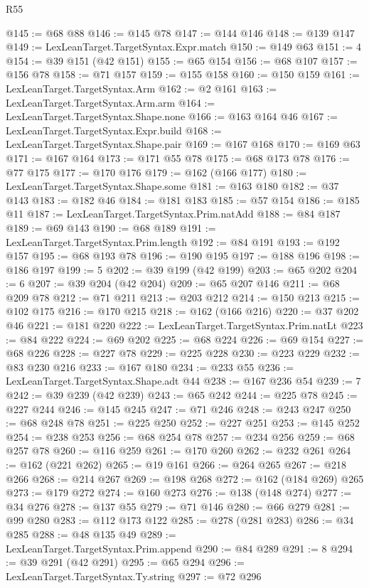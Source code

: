 \begin{lexlean}{R55}
\begin{coremodule}
{{{{{{{{{{{{{{{{{{{{{{{{{{{{{{{{{{{{{{{{{{{{{{{{{{{{{{{{{{{{@145 := @68 @88
@146 := @145 @78
@147 := @144 @146
@148 := @139 @147
@149 := LexLeanTarget.TargetSyntax.Expr.match
@150 := @149 @63
@151 := 4
@154 := @39 @151 (@42 @151)
@155 := @65 @154
@156 := @68 @107
@157 := @156 @78
@158 := @71 @157
@159 := @155 @158
@160 := @150 @159
@161 := LexLeanTarget.TargetSyntax.Arm
@162 := @2 @161
@163 := LexLeanTarget.TargetSyntax.Arm.arm
@164 := LexLeanTarget.TargetSyntax.Shape.none
@166 := @163 @164 @46
@167 := LexLeanTarget.TargetSyntax.Expr.build
@168 := LexLeanTarget.TargetSyntax.Shape.pair
@169 := @167 @168
@170 := @169 @63
@171 := @167 @164
@173 := @171 @55 @78
@175 := @68 @173 @78
@176 := @77 @175
@177 := @170 @176
@179 := @162 (@166 @177)
@180 := LexLeanTarget.TargetSyntax.Shape.some
@181 := @163 @180
@182 := @37 @143
@183 := @182 @46
@184 := @181 @183
@185 := @57 @154
@186 := @185 @11
@187 := LexLeanTarget.TargetSyntax.Prim.natAdd
@188 := @84 @187
@189 := @69 @143
@190 := @68 @189
@191 := LexLeanTarget.TargetSyntax.Prim.length
@192 := @84 @191
@193 := @192 @157
@195 := @68 @193 @78
@196 := @190 @195
@197 := @188 @196
@198 := @186 @197
@199 := 5
@202 := @39 @199 (@42 @199)
@203 := @65 @202
@204 := 6
@207 := @39 @204 (@42 @204)
@209 := @65 @207 @146
@211 := @68 @209 @78
@212 := @71 @211
@213 := @203 @212
@214 := @150 @213
@215 := @102 @175
@216 := @170 @215
@218 := @162 (@166 @216)
@220 := @37 @202 @46
@221 := @181 @220
@222 := LexLeanTarget.TargetSyntax.Prim.natLt
@223 := @84 @222
@224 := @69 @202
@225 := @68 @224
@226 := @69 @154
@227 := @68 @226
@228 := @227 @78
@229 := @225 @228
@230 := @223 @229
@232 := @83 @230 @216
@233 := @167 @180
@234 := @233 @55
@236 := LexLeanTarget.TargetSyntax.Shape.adt @44
@238 := @167 @236 @54
@239 := 7
@242 := @39 @239 (@42 @239)
@243 := @65 @242
@244 := @225 @78
@245 := @227 @244
@246 := @145 @245
@247 := @71 @246
@248 := @243 @247
@250 := @68 @248 @78
@251 := @225 @250
@252 := @227 @251
@253 := @145 @252
@254 := @238 @253
@256 := @68 @254 @78
@257 := @234 @256
@259 := @68 @257 @78
@260 := @116 @259
@261 := @170 @260
@262 := @232 @261
@264 := @162 (@221 @262)
@265 := @19 @161
@266 := @264 @265
@267 := @218 @266
@268 := @214 @267
@269 := @198 @268
@272 := @162 (@184 @269) @265
@273 := @179 @272
@274 := @160 @273
@276 := @138 (@148 @274)
@277 := @34 @276
@278 := @137 @55
@279 := @71 @146
@280 := @66 @279
@281 := @99 @280
@283 := @112 @173 @122
@285 := @278 (@281 @283)
@286 := @34 @285
@288 := @48 @135 @49
@289 := LexLeanTarget.TargetSyntax.Prim.append
@290 := @84 @289
@291 := 8
@294 := @39 @291 (@42 @291)
@295 := @65 @294
@296 := LexLeanTarget.TargetSyntax.Ty.string
@297 := @72 @296
}}}}}}}}}}}}}}}}}}}}}}}}}}}}}}}}}}}}}}}}}}}}}}}}}}}}}}}}}}}}
\end{coremodule}
\end{lexlean}
